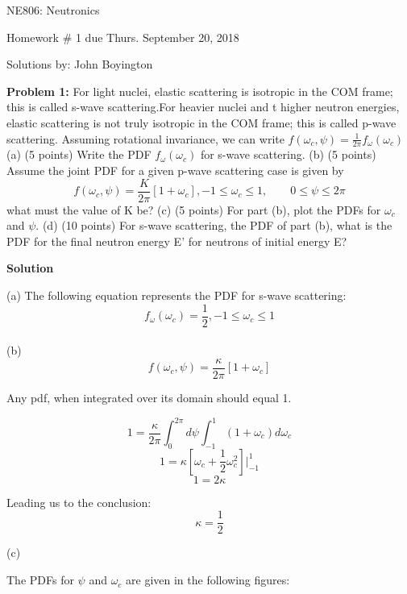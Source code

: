 \documentclass{amsart}
\theoremstyle{definition}
\begin{document}
\LARGE{NE806: Neutronics}
 
\large
Homework \# 1 due Thurs. September 20, 2018
 
Solutions by: John Boyington
\newline
\bigskip
 
 
\textbf{Problem 1:} For light nuclei, elastic scattering is isotropic in the COM frame; this is called s-wave scattering.For heavier nuclei and t higher neutron energies, elastic scattering is not truly isotropic in the COM frame; this is called p-wave scattering. Assuming rotational invariance, we can write
$f(\omega_c, \psi) = \frac{1}{2\pi} f_\omega (\omega_c)$ \newline
(a) (5 points) Write the PDF $f_\omega(\omega_c)$ for s-wave scattering. \newline
(b) (5 points) Assume the joint PDF for a given p-wave scattering case is given by
\begin{equation*}
    f(\omega_c, \psi) = \frac{K}{2\pi} [1+\omega_c], -1 \leq \omega_c \leq 1, \qquad 0 \leq \psi \leq 2\pi
\end{equation*}
what must the value of K be? \newline
(c) (5 points) For part (b), plot the PDFs for $\omega_c$ and $\psi$. \newline
(d) (10 points) For s-wave scattering, the PDF of part (b), what is the PDF for the final neutron energy E' for neutrons of initial energy E? \newline

\textbf{Solution}

(a)
The following equation represents the PDF for s-wave scattering:\\

$$ \boxed{f_\omega(\omega_c) = \frac{1}{2}, -1 \le \omega_c \le 1} $$ \\

(b)
$$ f(\omega_c, \psi) = \frac{\kappa}{2\pi} [1 + \omega_c] $$

Any pdf, when integrated over its domain should equal 1.

$$ 1 = \frac{\kappa}{2\pi} \int^{2\pi}_0 d\psi \int^1_{-1} (1 + \omega_c)d\omega_c $$
$$ 1 = \kappa [\omega_c + \frac{1}{2}\omega_c^2] |^1_{-1} $$
$$ 1 = 2\kappa $$

Leading us to the conclusion: \\
$$ \boxed{\kappa = \frac{1}{2}} $$

(c)

The PDFs for $\psi$ and $\omega_c$ are given in the following figures:\\
\end{document}
